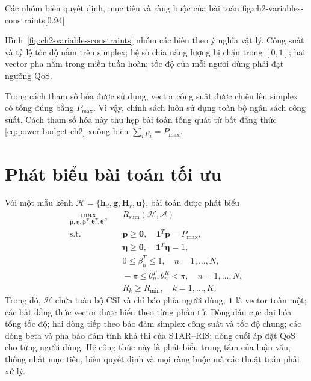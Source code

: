 {Các nhóm biến quyết định, mục tiêu và ràng buộc của bài toán}
{fig:ch2-variables-constraints}[0.94\linewidth]

Hình~\ref{fig:ch2-variables-constraints} nhóm các biến theo ý nghĩa vật lý. Công suất và tỷ lệ tốc độ nằm trên simplex; hệ số chia năng lượng bị chặn trong $[0,1]$; hai vector pha nằm trong miền tuần hoàn; tốc độ của mỗi người dùng phải đạt ngưỡng QoS.

Trong cách tham số hóa được sử dụng, vector công suất được chiếu lên simplex có tổng đúng bằng $P_{\max}$. Vì vậy, chính sách luôn sử dụng toàn bộ ngân sách công suất. Cách tham số hóa này thu hẹp bài toán tổng quát từ bất đẳng thức \eqref{eq:power-budget-ch2} xuống biên $\sum_i p_i=P_{\max}$.

\section{Phát biểu bài toán tối ưu}
Với một mẫu kênh $\mathcal{H}=\{\bm h_d,\bm g,\bm H_r,\bm u\}$, bài toán được phát biểu
\begin{subequations}
\label{prob:resource-allocation}
\begin{align}
 \max_{\bm p,\bm\eta,\bm\beta^T,\bm\theta^T,\bm\theta^R}
 &\quad R_{\mathrm{sum}}(\mathcal{H},\mathcal{A})\\
 \text{s.t.}
 &\quad \bm p\ge\bm0,\quad \mathbf{1}^T\bm p=P_{\max},\\
 &\quad \bm\eta\ge\bm0,\quad \mathbf{1}^T\bm\eta=1,\\
 &\quad 0\le\beta_n^T\le1,\quad n=1,\ldots,N,\\
 &\quad -\pi\le\theta_n^T,\theta_n^R<\pi,\quad n=1,\ldots,N,\\
 &\quad R_k\ge R_{\min},\quad k=1,\ldots,K.
\end{align}
\end{subequations}
Trong đó, $\mathcal H$ chứa toàn bộ CSI và chỉ báo phía người dùng; $\mathbf 1$ là vector toàn một; các bất đẳng thức vector được hiểu theo từng phần tử. Dòng đầu cực đại hóa tổng tốc độ; hai dòng tiếp theo bảo đảm simplex công suất và tốc độ chung; các dòng beta và pha bảo đảm tính khả thi của STAR--RIS; dòng cuối áp đặt QoS cho từng người dùng. Hệ công thức này là phát biểu trung tâm của luận văn, thống nhất mục tiêu, biến quyết định và mọi ràng buộc mà các thuật toán phải xử lý.


